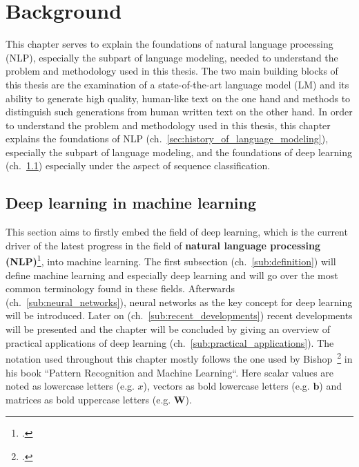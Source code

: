 \section{Background}
\label{ch:background}

This chapter serves to explain the foundations of natural language processing (NLP), especially the subpart of language modeling, needed to understand the problem and methodology used in this thesis. The two main building blocks of this thesis are the examination of a state-of-the-art language model (LM) and its ability to generate high quality, human-like text on the one hand and methods to distinguish such generations from human written text on the other hand. In order to understand the problem and methodology used in this thesis, this chapter explains the foundations of NLP (ch.~\ref{sec:history_of_language_modeling}), especially the subpart of language modeling, and the foundations of deep learning (ch.~\ref{sec:deep_learning_in_machine_learning}) especially under the aspect of sequence classification.

\subsection{Deep learning in machine learning}
\label{sec:deep_learning_in_machine_learning}

This section aims to firstly embed the field of deep learning, which is the current driver of the latest progress in the field of \textbf{natural language processing (NLP)}\footcite{Deng2018}, into machine learning. The first subsection (ch.~\ref{sub:definition}) will define machine learning and especially deep learning and will go over the most common terminology found in these fields. Afterwards (ch.~\ref{sub:neural_networks}), neural networks as the key concept for deep learning will be introduced. Later on (ch.~\ref{sub:recent_developments}) recent developments will be presented and the chapter will be concluded by giving an overview of practical applications of deep learning (ch.~\ref{sub:practical_applications}). The notation used throughout this chapter mostly follows the one used by Bishop~\footcite{bishop2006pattern} in his book “Pattern Recognition and Machine Learning“. Here scalar values are noted as lowercase letters (e.g. $ x $), vectors as bold lowercase letters (e.g. $ \pmb{b} $) and matrices as bold uppercase letters (e.g. $ \pmb{W} $).





